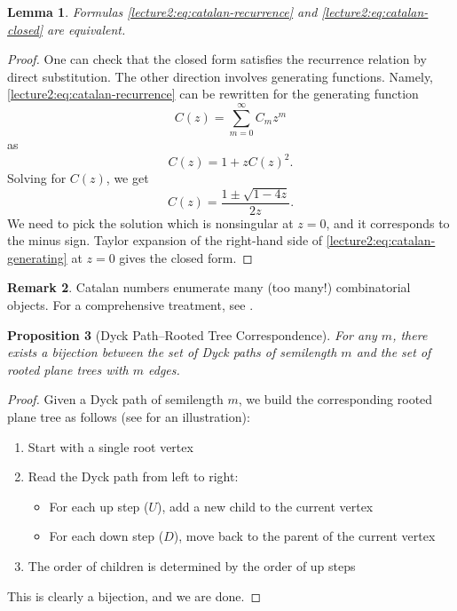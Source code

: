 \documentclass[letterpaper,11pt,oneside,reqno]{book}
\numberwithin{equation}{chapter}  %
\newtheorem{proposition}{Proposition}[chapter]  %
\newtheorem{lemma}[proposition]{Lemma}
\theoremstyle{definition}
\newtheorem{remark}[proposition]{Remark}
\begin{document}
\begin{lemma}
	\label{lecture2:lemma:equivalence-catalan}
	Formulas
	\eqref{lecture2:eq:catalan-recurrence} and \eqref{lecture2:eq:catalan-closed} are equivalent.
\end{lemma}
\begin{proof}
	One can check that the closed form satisfies the recurrence relation by direct substitution. The other direction
	involves generating functions. Namely,
	\eqref{lecture2:eq:catalan-recurrence} can be rewritten for the
	generating function
	\begin{equation*}
		C(z)=\sum_{m=0}^\infty C_m z^m
	\end{equation*}
	as
	\begin{equation*}
		C(z)=1+zC(z)^2.
	\end{equation*}
	Solving for $C(z)$, we get
	\begin{equation}
		\label{lecture2:eq:catalan-generating}
		C(z)=\frac{1\pm \sqrt{1-4z}}{2z}.
	\end{equation}
	We need to pick the solution which is nonsingular at $z=0$,
	and it corresponds to the minus sign.
	Taylor expansion of the right-hand side of
	\eqref{lecture2:eq:catalan-generating}
	at $z=0$
	gives the closed form.
\end{proof}

\begin{remark}
	\label{lecture2:rmk:stanley-catalans}
	Catalan numbers enumerate many (too many!) combinatorial objects. For a comprehensive treatment, see \cite{stanley2015catalan}.
\end{remark}

\begin{proposition}[Dyck Path--Rooted Tree Correspondence]
	\label{lecture2:prop:dyck-tree}
For any $m$, there exists a bijection between
the set of Dyck paths of semilength $m$ and the set of rooted plane trees with $m$ edges.
\end{proposition}

\begin{proof}
Given a Dyck path of semilength $m$, we build the corresponding rooted plane tree as follows
(see  for an illustration):
\begin{enumerate}
    \item Start with a single root vertex
    \item Read the Dyck path from left to right:
        \begin{itemize}
            \item For each up step ($U$), add a new child to the current vertex
            \item For each down step ($D$), move back to the parent of the current vertex
        \end{itemize}
    \item The order of children is determined by the order of up steps
\end{enumerate}
This is clearly a bijection, and we are done.
\end{proof}
\end{document}
